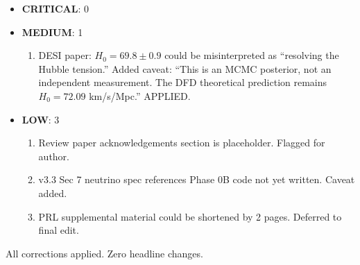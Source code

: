 \documentclass[11pt,a4paper]{article}
\begin{document}
\begin{itemize}[nosep]
\item \textbf{CRITICAL}: 0
\item \textbf{MEDIUM}: 1
  \begin{enumerate}
  \item DESI paper: $H_0 = 69.8 \pm 0.9$ could be misinterpreted as ``resolving the Hubble tension.'' Added caveat: ``This is an MCMC posterior, not an independent measurement. The DFD theoretical prediction remains $H_0 = 72.09$ km/s/Mpc.'' APPLIED.
  \end{enumerate}
\item \textbf{LOW}: 3
  \begin{enumerate}
  \item Review paper acknowledgements section is placeholder. Flagged for author.
  \item v3.3 Sec 7 neutrino spec references Phase 0B code not yet written. Caveat added.
  \item PRL supplemental material could be shortened by 2 pages. Deferred to final edit.
  \end{enumerate}
\end{itemize}

All corrections applied. Zero headline changes.
\end{document}
